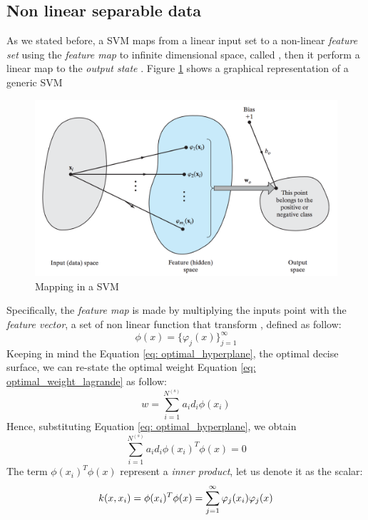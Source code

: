 \documentclass[11pt]{article}
\begin{document}
\subsection{Non linear separable data}
As we stated before, a SVM maps from a linear input set to a non-linear \emph{feature set} using the  \emph{feature map} to infinite dimensional space, called , then it perform a linear map to the \emph{output state} . Figure \ref{fig: SVM} shows a graphical representation of a generic SVM
\begin{figure}[H]
\centering
\includegraphics[scale=0.4]{images/SVM}
\caption{Mapping in a SVM}
\label{fig: SVM}
\end{figure}
Specifically, the \emph{feature map} is made by multiplying the inputs point with the \emph{feature vector}, a set of non linear function that transform , defined as follow:
\begin{equation}
\phi(x) = \{\varphi_j(x) \}^{\infty}_{j=1}
\label{eq: feature_map}
\end{equation}
Keeping in mind the Equation \ref{eq: optimal_hyperplane}, the optimal decise surface, we can re-state the optimal weight Equation \ref{eq: optimal_weight_lagrande} as follow:
\begin{equation}
w = \sum^{N^{(s)}}_{i = 1}a_id_i\phi(x_i)	
\end{equation}
Hence, substituting Equation \ref{eq: optimal_hyperplane}, we obtain
\begin{equation}
\sum^{N^{(s)}}_{i = 1}a_id_i\phi(x_i)^T\phi(x) = 0
\label{eq: optimal_hyperplane_feature}
\end{equation}
The term $\phi(x_i)^T\phi(x)$ represent a \emph{inner product}, let us denote it as the scalar:
\begin{equation}
\label{eq: kernel}
k(x, x_i) = \phi(x_i)^T\phi(x)  \\
= \sum^{\infty}_{j=1} \varphi_j(x_i)\varphi_j(x)
\end{equation}
\end{document}
